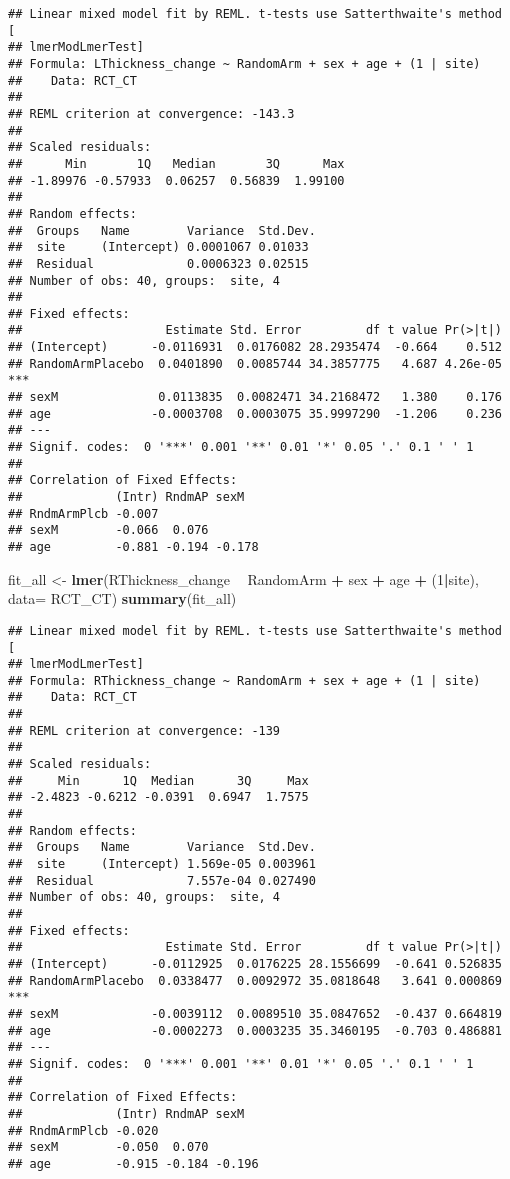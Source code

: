\documentclass[]{article}
\newenvironment{Shaded}{\begin{snugshade}}{\end{snugshade}}
\newcommand{\KeywordTok}[1]{\textcolor[rgb]{0.13,0.29,0.53}{\textbf{#1}}}
\newcommand{\DataTypeTok}[1]{\textcolor[rgb]{0.13,0.29,0.53}{#1}}
\newcommand{\DecValTok}[1]{\textcolor[rgb]{0.00,0.00,0.81}{#1}}
\newcommand{\StringTok}[1]{\textcolor[rgb]{0.31,0.60,0.02}{#1}}
\newcommand{\OperatorTok}[1]{\textcolor[rgb]{0.81,0.36,0.00}{\textbf{#1}}}
\newcommand{\NormalTok}[1]{#1}
\theoremstyle{definition}
\theoremstyle{definition}
\theoremstyle{definition}
\theoremstyle{remark}
\begin{document}
\begin{verbatim}
## Linear mixed model fit by REML. t-tests use Satterthwaite's method [
## lmerModLmerTest]
## Formula: LThickness_change ~ RandomArm + sex + age + (1 | site)
##    Data: RCT_CT
## 
## REML criterion at convergence: -143.3
## 
## Scaled residuals: 
##      Min       1Q   Median       3Q      Max 
## -1.89976 -0.57933  0.06257  0.56839  1.99100 
## 
## Random effects:
##  Groups   Name        Variance  Std.Dev.
##  site     (Intercept) 0.0001067 0.01033 
##  Residual             0.0006323 0.02515 
## Number of obs: 40, groups:  site, 4
## 
## Fixed effects:
##                    Estimate Std. Error         df t value Pr(>|t|)    
## (Intercept)      -0.0116931  0.0176082 28.2935474  -0.664    0.512    
## RandomArmPlacebo  0.0401890  0.0085744 34.3857775   4.687 4.26e-05 ***
## sexM              0.0113835  0.0082471 34.2168472   1.380    0.176    
## age              -0.0003708  0.0003075 35.9997290  -1.206    0.236    
## ---
## Signif. codes:  0 '***' 0.001 '**' 0.01 '*' 0.05 '.' 0.1 ' ' 1
## 
## Correlation of Fixed Effects:
##             (Intr) RndmAP sexM  
## RndmArmPlcb -0.007              
## sexM        -0.066  0.076       
## age         -0.881 -0.194 -0.178
\end{verbatim}

\begin{Shaded}
\begin{Highlighting}[]
\NormalTok{fit_all <-}\StringTok{ }\KeywordTok{lmer}\NormalTok{(RThickness_change }\OperatorTok{~}\StringTok{ }\NormalTok{RandomArm }\OperatorTok{+}\StringTok{ }\NormalTok{sex }\OperatorTok{+}\StringTok{ }\NormalTok{age }\OperatorTok{+}\StringTok{ }\NormalTok{(}\DecValTok{1}\OperatorTok{|}\NormalTok{site), }\DataTypeTok{data=}\NormalTok{ RCT_CT)}
\KeywordTok{summary}\NormalTok{(fit_all)  }
\end{Highlighting}
\end{Shaded}

\begin{verbatim}
## Linear mixed model fit by REML. t-tests use Satterthwaite's method [
## lmerModLmerTest]
## Formula: RThickness_change ~ RandomArm + sex + age + (1 | site)
##    Data: RCT_CT
## 
## REML criterion at convergence: -139
## 
## Scaled residuals: 
##     Min      1Q  Median      3Q     Max 
## -2.4823 -0.6212 -0.0391  0.6947  1.7575 
## 
## Random effects:
##  Groups   Name        Variance  Std.Dev.
##  site     (Intercept) 1.569e-05 0.003961
##  Residual             7.557e-04 0.027490
## Number of obs: 40, groups:  site, 4
## 
## Fixed effects:
##                    Estimate Std. Error         df t value Pr(>|t|)    
## (Intercept)      -0.0112925  0.0176225 28.1556699  -0.641 0.526835    
## RandomArmPlacebo  0.0338477  0.0092972 35.0818648   3.641 0.000869 ***
## sexM             -0.0039112  0.0089510 35.0847652  -0.437 0.664819    
## age              -0.0002273  0.0003235 35.3460195  -0.703 0.486881    
## ---
## Signif. codes:  0 '***' 0.001 '**' 0.01 '*' 0.05 '.' 0.1 ' ' 1
## 
## Correlation of Fixed Effects:
##             (Intr) RndmAP sexM  
## RndmArmPlcb -0.020              
## sexM        -0.050  0.070       
## age         -0.915 -0.184 -0.196
\end{verbatim}
\end{document}
